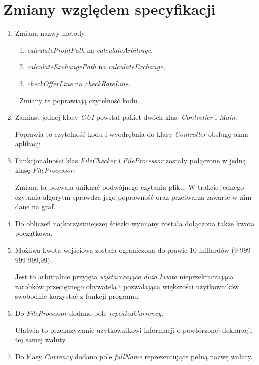 \documentclass[a4paper,11pt]{article}
\begin{document}
\section{Zmiany względem specyfikacji}
\begin{enumerate}
\item Zmiana nazwy metody:
\begin{enumerate}
\item \textit{calculateProfitPath} na \textit{calculateArbitrage},
\item \textit{calculateExchangePath} na \textit{calculateExchange},
\item \textit{checkOfferLine} na \textit{checkRateLine}.
\end{enumerate}.
Zmiany te poprawiają czytelność kodu.

\item Zamiast jednej klasy \textit{GUI} powstał pakiet dwóch klas: \textit{Controller} i \textit{Main}.

Poprawia to czytelność kodu i wyodrębnia do klasy \textit{Controller} obsługę okna aplikacji.

\item Funkcjonalności klas \textit{FileChecker} i \textit{FileProcessor} zostały połączone w jedną klasę \textit{FileProcessor}.

Zmiana ta pozwala uniknąć podwójnego czytania pliku. W trakcie jednego czytania algorytm sprawdza jego poprawność oraz przetwarza zawarte w nim dane na graf.

\item Do obliczeń najkorzystniejszej ścieżki wymiany została dołączona także kwota początkowa.

\item Możliwa kwota wejściowa została ograniczona do prawie 10 miliardów (9 999 999 999,99).

Jest to arbitralnie przyjęta \textit{wystarczająco duża kwota} nieprzekraczająca zarobków przeciętnego obywatela i pozwalająca większości użytkowników swobodnie korzystać z funkcji programu.

\item Do \textit{FileProcessor} dodano pole \textit{repeatedCurrency}.

Ułatwia to przekazywanie użytkownikowi informacji o powtórzonej deklaracji tej samej waluty.

\item Do klasy \textit{Currency} dodano pole \textit{fullName} reprezentujące pełną nazwę waluty.


\end{enumerate}
\end{document}
